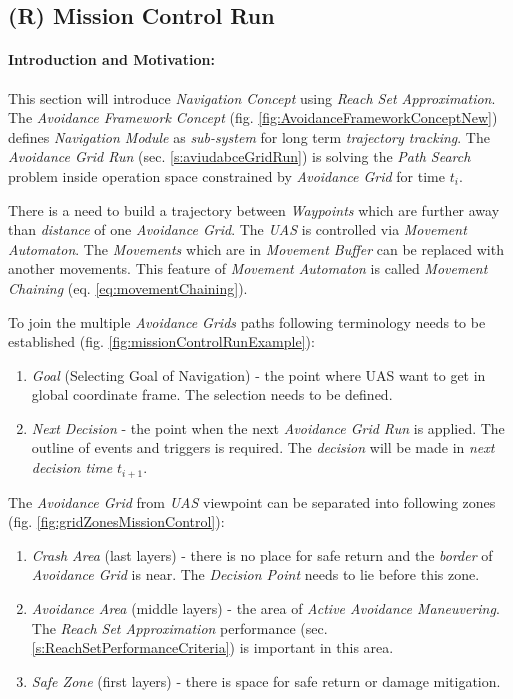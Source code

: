 \setcounter{chapter}{6}
\setcounter{section}{7}
\setcounter{subsection}{3}

\newpage
\subsection{(R) Mission Control Run}\label{s:missionControlRun}
\paragraph{Introduction and Motivation:}  This section will introduce \emph{Navigation Concept} using  \emph{Reach Set Approximation}. The \emph{Avoidance Framework Concept} (fig. \ref{fig:AvoidanceFrameworkConceptNew}) defines \emph{Navigation Module} as \emph{sub-system} for long term \emph{trajectory tracking}.  The \emph{Avoidance Grid Run} (sec. \ref{s:aviudabceGridRun}) is solving the \emph{Path Search} problem inside operation space constrained by \emph{Avoidance Grid} for time $t_i$. 

There is a need to build a trajectory between \emph{Waypoints} which are further away than \emph{distance} of one \emph{Avoidance Grid}.  The \emph{UAS} is controlled via \emph{Movement Automaton}. The \emph{Movements} which are in \emph{Movement Buffer} can be replaced with another movements. This feature of \emph{Movement Automaton} is called \emph{Movement Chaining} (eq. \ref{eq:movementChaining}).

To join the multiple \emph{Avoidance Grids} paths following terminology needs to be established (fig. \ref{fig:missionControlRunExample}):
\begin{enumerate}
    \item \emph{Goal} (Selecting Goal of Navigation) - the point where UAS want to get in global coordinate frame. The selection needs to be defined.
    
    \item \emph{Next Decision} - the point when the next \emph{Avoidance Grid Run} is applied. The outline of events and triggers is required. The \emph{decision} will be made in \emph{next decision time} $t_{i+1}$.
\end{enumerate}

The \emph{Avoidance Grid} from \emph{UAS} viewpoint can be separated into following zones (fig. \ref{fig:gridZonesMissionControl}):
\begin{enumerate}
    \item \emph{Crash Area} (last layers) - there is no place for safe return and the \emph{border} of \emph{Avoidance Grid} is near. The \emph{Decision Point} needs to lie before this zone.
    
    \item \emph{Avoidance Area} (middle layers) - the area of \emph{Active Avoidance Maneuvering}. The \emph{Reach Set Approximation} performance (sec. \ref{s:ReachSetPerformanceCriteria}) is important in this area.
    
    \item \emph{Safe Zone} (first layers) - there is space for safe return or damage mitigation.
\end{enumerate}

